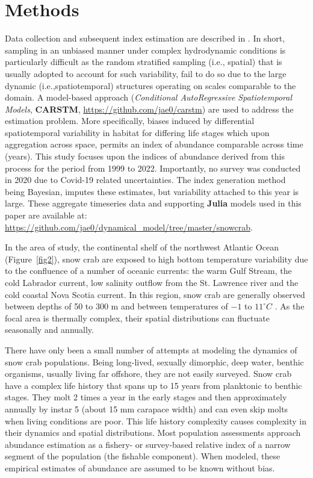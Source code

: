 \documentclass[
	letterpaper, %
	10pt, %
]{article}
\begin{document}
 

\section{Methods}

Data collection and subsequent index estimation are described in \cite{Choi_2020, Choi_et_al_2022}. In short, sampling in an unbiased manner under complex hydrodynamic conditions is particularly difficult as the random stratified sampling (i.e., spatial) that is usually adopted to account for such variability, fail to do so due to the large dynamic (i.e.,spatiotemporal) structures operating on scales comparable to the domain. A model-based approach (\emph{Conditional AutoRegressive Spatiotemporal Models}, \textbf{CARSTM}, \url{https://github.com/jae0/carstm}) are used to address the estimation problem. More specifically, biases induced by differential spatiotemporal variability in habitat for differing life stages which upon aggregation across
space, permits an index of abundance comparable across time (years). 
This study focuses upon the indices of abundance derived from this process for the period from 1999 to 2022. Importantly, no survey was conducted in 2020 due to Covid-19 related uncertainties. The index generation method being Bayesian, imputes these estimates, but
variability attached to this year is large. These aggregate timeseries data and supporting \textbf{Julia} models used in this paper are available at: \url{https://github.com/jae0/dynamical_model/tree/master/snowcrab}.

In the area of study, the continental shelf of the northwest Atlantic
Ocean (Figure~\ref{fig2}), snow crab are exposed to high bottom temperature 
variability due to the confluence of a number of oceanic currents: the warm Gulf Stream, the
cold Labrador current, low salinity outflow from the St. Lawrence river
and the cold coastal Nova Scotia current. In this region, snow crab are
generally observed between depths of 50 to 300 m and between
temperatures of $-1$ to $11^{\circ}C$ \cite{Choi_2011}. As the focal area is thermally
complex, their spatial distributions can fluctuate seasonally and
annually. 

There have only been a small number of attempts at modeling the dynamics
of snow crab populations. Being long-lived, sexually dimorphic, deep
water, benthic organisms, usually living far offshore, they are not
easily surveyed. Snow crab have a complex life history that spans
up to 15 years from planktonic to benthic stages. They molt 2 times
a year in the early stages and then approximately annually by instar
5 (about 15 mm carapace width) and can even skip molts when living conditions
are poor. This life history complexity causes complexity in their
dynamics and spatial distributions. Most population assessments approach
abundance estimation as a fishery- or survey-based relative index
of a narrow segment of the population (the fishable component). When
modeled, these empirical estimates of abundance are assumed to be
known without bias.
\end{document}
